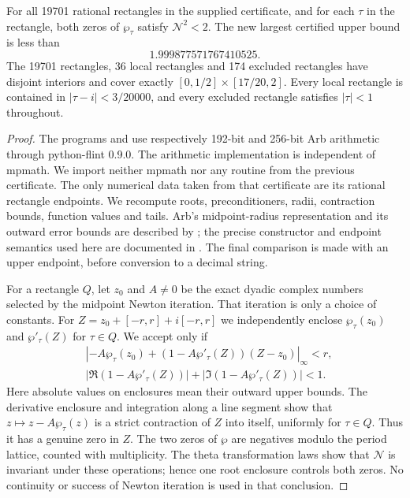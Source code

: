 \begin{theorem}\label{push:src:E.4.1}
For all 19701 rational rectangles in the supplied certificate, and for
each $\tau$ in the rectangle, both zeros of $\wp_\tau$ satisfy
$\mathcal N^2<2$. The new largest certified upper bound is less than
\[
 1.999877571767410525.
\]
The 19701 rectangles, 36 local rectangles and 174 excluded rectangles
have disjoint interiors and cover exactly
$[0,1/2]\times[17/20,2]$. Every local rectangle is contained in
$|\tau-i|<3/20000$, and every excluded rectangle satisfies
$|\tau|<1$ throughout.
\end{theorem}

\begin{proof}
The programs  and
 use respectively 192-bit and 256-bit
Arb arithmetic through python-flint 0.9.0. The arithmetic implementation
is independent of mpmath. We import neither mpmath nor any routine
from the previous certificate. The only numerical data taken from that
certificate are its rational rectangle endpoints. We recompute roots,
preconditioners, radii, contraction bounds, function values and tails.
Arb's midpoint-radius representation and its outward error bounds are
described by \citet[Sections 2--3]{Johansson2016}; the precise
constructor and endpoint semantics used here are documented in
\citet{PythonFlint2026}. The final comparison is made with an upper
endpoint, before conversion to a decimal string.

For a rectangle $Q$, let $z_0$ and $A\ne0$ be the exact dyadic complex
numbers selected by the midpoint Newton iteration. That iteration is
only a choice of constants. For $Z=z_0+[-r,r]+i[-r,r]$ we independently
enclose $\wp_\tau(z_0)$ and $\wp'_\tau(Z)$ for $\tau\in Q$.
We accept only if
\[
 \begin{split}
 &\left|-A\wp_\tau(z_0)
 +(1-A\wp'_\tau(Z))(Z-z_0)\right|_\infty<r,\\
 &|\Re(1-A\wp'_\tau(Z))|
       +|\Im(1-A\wp'_\tau(Z))|<1.
 \end{split}
\]
Here absolute values on enclosures mean their outward upper bounds.
The derivative enclosure and integration along a line segment show
that $z\mapsto z-A\wp_\tau(z)$ is a strict contraction of $Z$ into
itself, uniformly for $\tau\in Q$. Thus it has a genuine zero in $Z$.
The two zeros of $\wp$ are negatives modulo the period lattice, counted
with multiplicity. The theta transformation laws show that
$\mathcal N$ is invariant under these operations; hence one root
enclosure controls both zeros. No continuity or success of Newton
iteration is used in that conclusion.


\end{proof}
